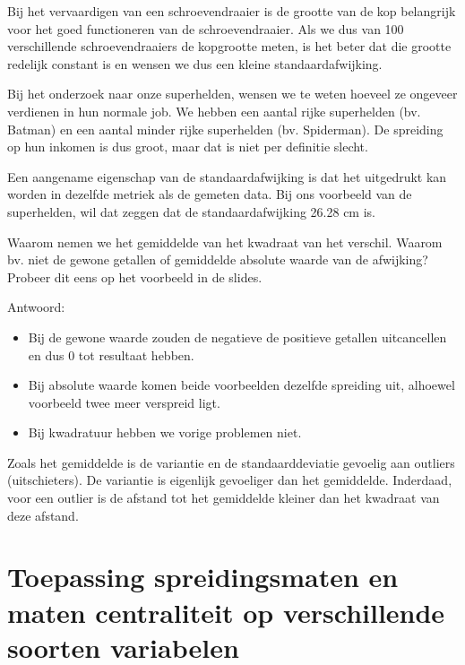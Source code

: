 \begin{example}
  Bij het vervaardigen van een schroevendraaier is de grootte van de kop belangrijk voor het goed functioneren van de schroevendraaier. Als we dus van 100 verschillende schroevendraaiers de kopgrootte meten, is het beter dat die grootte redelijk constant is en wensen we dus een kleine standaardafwijking.
\end{example}

\begin{example}
  Bij het onderzoek naar onze superhelden, wensen we te weten hoeveel ze ongeveer verdienen in hun normale job. We hebben een aantal rijke superhelden (bv. Batman) en een aantal minder rijke superhelden (bv. Spiderman). De spreiding op hun inkomen is dus groot, maar dat is niet per definitie slecht.
\end{example}


Een aangename eigenschap van de standaardafwijking is dat het uitgedrukt kan worden in dezelfde metriek als de gemeten data. Bij ons voorbeeld van de superhelden, wil dat zeggen dat de standaardafwijking 26.28 cm is.

\begin{exercise}
  Waarom nemen we het gemiddelde van het kwadraat van het verschil. Waarom bv. niet de gewone getallen of gemiddelde absolute waarde van de afwijking? Probeer dit eens op het voorbeeld in de slides.
\end{exercise}

Antwoord:
\begin{itemize}
  \item Bij de gewone waarde zouden de negatieve de positieve getallen uitcancellen en dus 0 tot resultaat hebben.
  \item Bij absolute waarde komen beide voorbeelden dezelfde spreiding uit, alhoewel voorbeeld twee meer verspreid ligt.
  \item Bij kwadratuur hebben we vorige problemen niet.
\end{itemize}

Zoals het gemiddelde is de variantie en de standaarddeviatie gevoelig aan outliers (uitschieters). De variantie is eigenlijk gevoeliger dan het gemiddelde. Inderdaad, voor een outlier is de afstand tot het gemiddelde kleiner dan het kwadraat van deze afstand.

\section[Centrum- en spreidingsmaten toepassen]{Toepassing spreidingsmaten en maten centraliteit op verschillende soorten variabelen}

